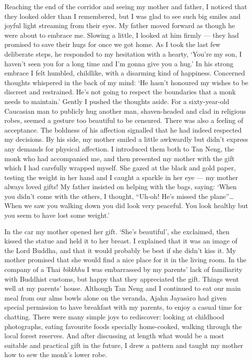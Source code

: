 Reaching the end of the corridor and seeing my mother and father, I
noticed that they looked older than I remembered, but I was glad to see
such big smiles and joyful light streaming from their eyes. My father
moved forward as though he were about to embrace me. Slowing a little, I
looked at him firmly --- they had promised to save their hugs for once
we got home. As I took the last few deliberate steps, he responded to my
hesitation with a hearty, `You're my son, I haven't seen you for a long
time and I'm gonna give you a hug.' In his strong embrace I felt
humbled, childlike, with a disarming kind of happiness. Concerned
thoughts whispered in the back of my mind: `He hasn't honoured my wishes
to be discreet and restrained. He's not going to respect the boundaries
that a monk needs to maintain.' Gently I pushed the thoughts aside. For
a sixty-year-old Caucasian man to publicly hug another man,
shaven-headed and clad in religious robes, seemed a gesture too
beautiful to be censured. There was also a feeling of acceptance. The
boldness of his affection signalled that he had indeed respected my
decisions. By his side, my mother smiled a little awkwardly but didn't
express any demands for physical affection. I introduced them both to
Tan Neng, the monk who had accompanied me, and then presented my mother
with the gift which I had carefully wrapped myself. She gazed at the
black and gold paper, testing the weight in her hand and I caught a
sparkle in her eye --- my mother always loved gifts! My father insisted
on helping with the bags, saying: `When you didn't come with the others,
I thought, ``Uh-oh! He's missed the plane''\ldots{} When we saw you
walking down you did look very peaceful. You look healthy but you seem
to have lost some weight.'

In the car my mother opened her gift. `She's beautiful', she exclaimed,
then kissed the statue and held it to her breast. I explained that it
was an image of the Lord Buddha, and that it would probably be best if
she didn't kiss it. My mother promised that she would find a nice place
for it in the living room. In the company of a Thai \emph{bikkhhu} I was
embarrassed by my parents' lack of familiarity with Buddhist customs,
but happy that they appreciated the gift. Things went well at my
parents' house. Although Tan Neng and I continued to eat our main meal
from our alms bowls alone on the veranda, Ajahn Jayasāro had given
special permission to have breakfast with my parents, to enjoy a casual
time for chatting. There were many simple joys to rediscover: looking at
childhood photographs, eating favourite foods specially home-cooked,
walking through the local forest reserves. And after discussing at
length what would be a most suitable and practical gift in the future, I
drew a pattern and taught my mother how to sew the monk's lower robe.

